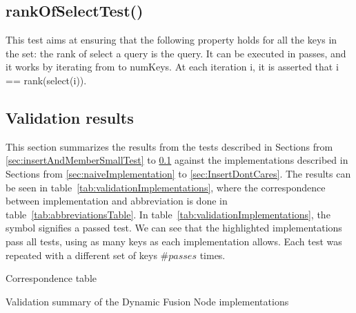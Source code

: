 \subsection{{\ttfamily rankOfSelectTest()}} \label{sec:rankOfSelectTest}

This test aims at ensuring that the following property holds for all the keys in the set: the rank of select a query is the query. It can be executed in passes, and it works by iterating from {} to {\ttfamily numKeys}. At each iteration {\ttfamily i}, it is asserted that {\ttfamily i == rank(select(i))}.


\subsection{Validation results}

This section summarizes the results from the tests described in Sections from \ref{sec:insertAndMemberSmallTest} to \ref{sec:rankOfSelectTest} against the implementations described in Sections from \ref{sec:naiveImplementation} to \ref{sec:InsertDontCares}.
The results can be seen in table~\ref{tab:validationImplementations}, where the correspondence between implementation and abbreviation is done in table~\ref{tab:abbreviationsTable}.
In table~\ref{tab:validationImplementations}, the \checkmark symbol signifies a passed test.
We can see that the highlighted implementations pass all tests, using as many keys as each implementation allows.
Each test was repeated with a different set of keys \#$passes$ times.

\begin{table}[H]
\centering

\caption{Correspondence table}
\label{tab:abbreviationsTable}
\end{table}

\begin{table}[H]
\centering

\caption{Validation summary of the Dynamic Fusion Node implementations}
\label{tab:validationImplementations}
\end{table}